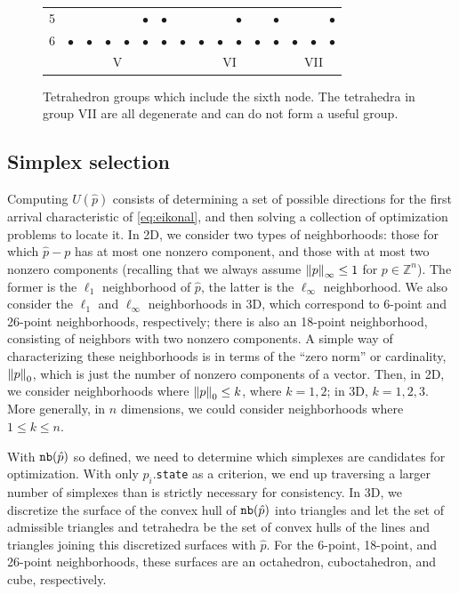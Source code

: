 \documentclass[eikonal.tex]{subfiles}
\begin{document}
\begin{figure}[t]
\begin{tabular}{c|cccccc|cccccc|ccc}
    5 & & & & & $\bullet$ & $\bullet$ & & & & $\bullet$ & & $\bullet$ & & & $\bullet$ \\
    6 & $\bullet$ & $\bullet$ & $\bullet$ & $\bullet$ & $\bullet$ & $\bullet$ & $\bullet$ & $\bullet$ & $\bullet$ & $\bullet$ & $\bullet$ & $\bullet$ & $\bullet$ & $\bullet$ & $\bullet$ \\
    \multicolumn{1}{c}{} & \multicolumn{6}{c}{V} & \multicolumn{6}{c}{VI} & \multicolumn{3}{c}{VII}
  \end{tabular}
  \caption{Tetrahedron groups which include the sixth node. The
    tetrahedra in group VII are all degenerate and can do not form a
    useful group.}\label{fig:olim26-tetrahedra}
  \vspace{1em}
\end{figure}

\subsection{Simplex selection}

Computing $U(\hat{p})$ consists of determining a set of possible
directions for the first arrival characteristic of \cref{eq:eikonal},
and then solving a collection of optimization problems to locate
it. In 2D, we consider two types of neighborhoods: those for which
$\hat{p} - p$ has at most one nonzero component, and those with at
most two nonzero components (recalling that we always assume
$\left\|p\right\|_\infty \leq 1$ for $p \in \mathbb{Z}^n$). The former is the
$\ell_1$ neighborhood of $\hat{p}$, the latter is the $\ell_\infty$
neighborhood. We also consider the $\ell_1$ and $\ell_\infty$
neighborhoods in 3D, which correspond to 6-point and 26-point
neighborhoods, respectively; there is also an 18-point neighborhood,
consisting of neighbors with two nonzero components. A simple way of
characterizing these neighborhoods is in terms of the ``zero norm'' or
cardinality, $\left\|p\right\|_0$, which is just the number of nonzero
components of a vector. Then, in 2D, we consider neighborhoods where
$\left\|p\right\|_0 \leq k$, where $k = 1, 2$; in 3D, $k = 1, 2, 3$. More
generally, in $n$ dimensions, we could consider neighborhoods where
$1 \leq k \leq n$.

With $\texttt{nb}(\hat{p})$ so defined, we need to determine which simplexes
are candidates for optimization. With only $p_i$.\texttt{state} as a
criterion, we end up traversing a larger number of simplexes than is
strictly necessary for consistency. In 3D, we discretize the surface
of the convex hull of $\texttt{nb}(\hat{p})$ into triangles and let the set
of admissible triangles and tetrahedra be the set of convex hulls of
the lines and triangles joining this discretized surfaces with
$\hat{p}$. For the 6-point, 18-point, and 26-point neighborhoods,
these surfaces are an octahedron, cuboctahedron, and cube,
respectively.
\end{document}
